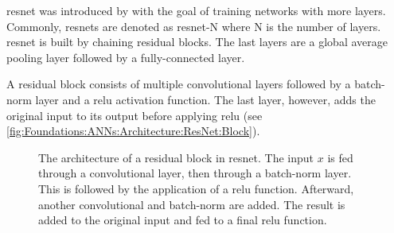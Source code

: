 \Ac{resnet} was introduced by \textcite{he2016deep} with the goal of training networks with more layers. Commonly, \acp{resnet} are denoted as \acs{resnet}-N where N is the number of layers. \Ac{resnet} is built by chaining residual blocks. The last layers are a global average pooling layer followed by a fully-connected layer.

A residual block consists of multiple convolutional layers followed by a \ac{batch-norm} layer and a \ac{relu} activation function. The last layer, however, adds the original input to its output before applying \ac{relu} (see \autoref{fig:Foundations:ANNs:Architecture:ResNet:Block}).

\begin{figure}
    \centering
    \caption[Residual block architecture]{The architecture of a residual block in \acs*{resnet}. The input $x$ is fed through a convolutional layer, then through a \acl{batch-norm} layer. This is followed by the application of a \ac{relu} function. Afterward, another convolutional and \acl{batch-norm} are added. The result is added to the original input and fed to a final \ac{relu} function.}
    \label{fig:Foundations:ANNs:Architecture:ResNet:Block}
\end{figure}


